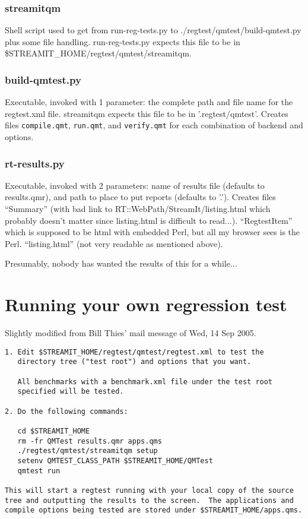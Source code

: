 \documentclass[11pt]{article}
\begin{document}
\subsubsection{streamitqm}
Shell script used to get from run-reg-tests.py to 
./regtest/qmtest/build-qmtest.py
plus some file handling.  run-reg-tests.py expects this file to be in 
\$STREAMIT\_HOME/regtest/qmtest/streamitqm.

\subsubsection{build-qmtest.py}
Executable, invoked with 1 parameter: the complete path and file name for the 
regtest.xml file.  streamitqm expects this file to be in '.regtest/qmtest'.
Creates files {\tt compile.qmt}, {\tt run.qmt}, and {\tt verify.qmt}
for each combination of backend and options.

\subsubsection{rt-results.py}
Executable, invoked with 2 parameters: name of results file (defaults
to results.qmr), and path to place to put reports (defaults to '.').
Creates files 
``Summary'' (with bad link to RT::WebPath/StreamIt/listing.html which
probably doesn't matter since listing.html is difficult to read...).
``RegtestItem'' which is supposed to be html with embedded Perl, but
all my browser sees is the Perl.
``listing.html'' (not very readable as mentioned above).

Presumably, nobody has wanted the results of this for a while...

\section{Running your own regression test}

Slightly modified from Bill Thies' mail message of  Wed, 14 Sep 2005.
\begin{verbatim}
1. Edit $STREAMIT_HOME/regtest/qmtest/regtest.xml to test the
   directory tree ("test root") and options that you want.

   All benchmarks with a benchmark.xml file under the test root
   specified will be tested.

2. Do the following commands:

   cd $STREAMIT_HOME
   rm -fr QMTest results.qmr apps.qms
   ./regtest/qmtest/streamitqm setup
   setenv QMTEST_CLASS_PATH $STREAMIT_HOME/QMTest
   qmtest run

This will start a regtest running with your local copy of the source
tree and outputting the results to the screen.  The applications and
compile options being tested are stored under $STREAMIT_HOME/apps.qms.
\end{verbatim}
\end{document}
